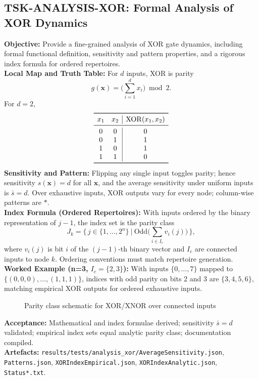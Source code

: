 \documentclass{article}
\begin{document}
\subsection{TSK-ANALYSIS-XOR: Formal Analysis of XOR Dynamics}
\textbf{Objective:} Provide a fine-grained analysis of XOR gate dynamics, including formal functional definition, sensitivity and pattern properties, and a rigorous index formula for ordered repertoires.\\
\textbf{Local Map and Truth Table:} For \(d\) inputs, XOR is parity
\[
g(\mathbf{x}) = \big(\sum_{i=1}^{d} x_i\big)\bmod 2.
\]
For \(d=2\),
\[
\begin{array}{cc|c}
\toprule
 x_1 & x_2 & \mathrm{XOR}(x_1,x_2) \\
\midrule
 0 & 0 & 0 \\
 0 & 1 & 1 \\
 1 & 0 & 1 \\
 1 & 1 & 0 \\
\bottomrule
\end{array}
\]
\textbf{Sensitivity and Pattern:} Flipping any single input toggles parity; hence sensitivity \(s(\mathbf{x})=d\) for all \(\mathbf{x}\), and the average sensitivity under uniform inputs is \(\bar{s}=d\). Over exhaustive inputs, XOR outputs vary for every node; column-wise patterns are \(*\).\\
\textbf{Index Formula (Ordered Repertoires):} With inputs ordered by the binary representation of \(j-1\), the index set is the parity class
\[
J_k=\big\{\,j\in\{1,\dots,2^n\}\ \big|\ \mathrm{Odd}\big(\sum_{i\in I_c} v_i(j)\big)\,\big\},
\]
where \(v_i(j)\) is bit \(i\) of the \((j-1)\)-th binary vector and \(I_c\) are connected inputs to node \(k\). Ordering conventions must match repertoire generation.\\
\textbf{Worked Example (n=3, \(I_c=\{2,3\}\)):} With inputs \(\{0,\dots,7\}\) mapped to \(\{(0,0,0),\dots,(1,1,1)\}\), indices with odd parity on bits 2 and 3 are \(\{3,4,5,6\}\), matching empirical XOR outputs for ordered exhaustive inputs.\\
\begin{figure}[h]
\centering
{}
\caption{Parity class schematic for XOR/XNOR over connected inputs}
\end{figure}
\textbf{Acceptance:} Mathematical and index formulae derived; sensitivity \(\bar{s}=d\) validated; empirical index sets equal analytic parity class; documentation compiled.\\
\textbf{Artefacts:} \texttt{results/tests/analysis\_xor/AverageSensitivity.json}, \texttt{Patterns.json}, \texttt{XORIndexEmpirical.json}, \texttt{XORIndexAnalytic.json}, \texttt{Status*.txt}.
\end{document}
